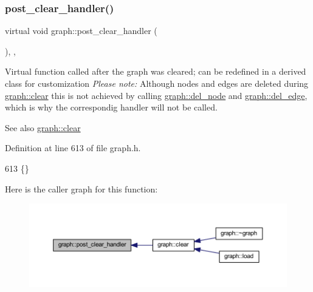 \subsubsection{\texorpdfstring{post\+\_\+clear\+\_\+handler()}{post\_clear\_handler()}}
{\footnotesize\ttfamily virtual void graph\+::post\+\_\+clear\+\_\+handler (\begin{DoxyParamCaption}{ }\end{DoxyParamCaption})\hspace{0.3cm}{\ttfamily [inline]}, {\ttfamily [virtual]}, {\ttfamily [inherited]}}

Virtual function called after the graph was cleared; can be redefined in a derived class for customization {\itshape Please note\+:} Although nodes and edges are deleted during \mbox{\hyperlink{classgraph_a9ff5d6af3653e79f87b836701453f55a}{graph\+::clear}} this is not achieved by calling \mbox{\hyperlink{classgraph_a8bdc09d5b9ac4bd26586b054d8fcbe91}{graph\+::del\+\_\+node}} and \mbox{\hyperlink{classgraph_ad9356508c49c542dfd4b7169297387c6}{graph\+::del\+\_\+edge}}, which is why the correspondig handler will not be called.

\begin{DoxySeeAlso}{See also}
\mbox{\hyperlink{classgraph_a9ff5d6af3653e79f87b836701453f55a}{graph\+::clear}} 
\end{DoxySeeAlso}


Definition at line 613 of file graph.\+h.


\begin{DoxyCode}
613 \{\} 
\end{DoxyCode}
Here is the caller graph for this function\+:
\nopagebreak
\begin{figure}[H]
\begin{center}
\leavevmode
\includegraphics[width=350pt]{classgraph_a870633528590b7925cd27776bdd2bbd2_icgraph}
\end{center}
\end{figure}
\mbox{\label{classgraph_ab9ac8bcc7288986de69cd467beb33600}} 
